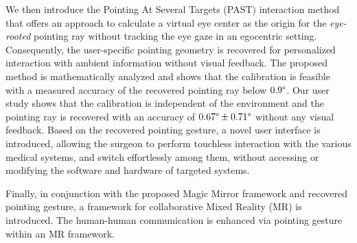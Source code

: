 {We then introduce the Pointing At Several Targets (PAST) interaction method that offers an approach to calculate a virtual eye center as the origin for the} \textit{eye-rooted} pointing ray without tracking the eye gaze in an egocentric setting. Consequently, the user-specific pointing geometry is recovered for personalized interaction with ambient information without visual feedback.
{The proposed method is mathematically analyzed and shows that the calibration is feasible with a measured accuracy of the recovered pointing ray below $0.9\degree$.}
Our user study shows that the calibration is independent of the environment and the pointing ray is recovered with an accuracy of $0.67\degree \pm 0.71\degree$ without any visual feedback. 
Based on the recovered pointing gesture, a novel user interface is introduced, {allowing the surgeon to perform touchless interaction with the {various} medical systems, and switch effortlessly among them, without accessing or modifying the software and hardware of targeted systems.}

Finally, in conjunction with the proposed Magic Mirror framework and recovered pointing gesture, {a framework for collaborative Mixed Reality (MR) is introduced. The human-human communication is enhanced via pointing gesture within an MR framework. }



%
%

